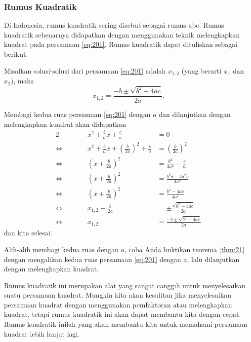 	\subsubsection{Rumus Kuadratik}
		
		Di Indonesia, rumus kuadratik sering disebut sebagai rumus abc. Rumus kuadratik sebenarnya didapatkan dengan menggunakan teknik melengkapkan kuadrat pada persamaan \ref{eq:201}. Rumus kuadratik dapat dituliskan sebagai berikut.
		
		\begin{teorema} \label{thm:21}
			Misalkan solusi-solusi dari persamaan \ref{eq:201} adalah $ x_{1, 2} $ (yang berarti $ x_{1} $ dan $ x_{2} $), maka
			\begin{equation} \label{eq:207}
				x_{1, 2} = \frac{-b \pm \sqrt{b^{2} - 4ac}}{2a}.
			\end{equation}
		\end{teorema}
		\begin{bukti}
			Membagi kedua ruas persamaan \ref{eq:201} dengan $ a $ dan dilanjutkan dengan melengkapkan kuadrat akan didapatkan
			\begin{alignat*}{2}
				&\qquad& x^{2} + \frac{b}{a}x + \frac{c}{a} &= 0 \\
				\iff&& x^{2} + \frac{b}{a}x + \left(\frac{b}{2a}\right)^{2} + \frac{c}{a} &= \left(\frac{b}{2a}\right)^{2} \\
				\iff&& \left(x + \frac{b}{2a}\right)^{2} &= \frac{b^{2}}{4a^{2}} - \frac{c}{a} \\
				\iff&& \left(x + \frac{b}{2a}\right)^{2} &= \frac{b^{2}a - 4a^{2}c}{4a^{3}} \\
				\iff&& \left(x + \frac{b}{2a}\right)^{2} &= \frac{b^{2} - 4ac}{4a^{2}} \\
				\iff&& x_{1, 2} + \frac{b}{2a} &= \pm \frac{\sqrt{b^{2} - 4ac}}{2a} \\
				\iff&& x_{1, 2} &= \frac{-b \pm \sqrt{b^{2} - 4ac}}{2a}
			\end{alignat*}
			dan kita selesai.
		\end{bukti}
	
		\begin{explbox}
			Alih-alih membagi kedua ruas dengan $ a $, coba Anda buktikan teorema \ref{thm:21} dengan mengalikan kedua ruas persamaan \ref{eq:201} dengan $ a $, lalu dilanjutkan dengan melengkapkan kuadrat.
		\end{explbox}
		
		\par Rumus kuadratik ini merupakan alat yang sangat canggih untuk menyelesaikan suatu persamaan kuadrat. Mungkin kita akan kesulitan jika menyelesaikan persamaan kuadrat dengan menggunakan pemfaktoran atau melengkapkan kuadrat, tetapi rumus kuadratik ini akan dapat membantu kita dengan cepat. Rumus kuadratik inilah yang akan membantu kita untuk memahami persamaan kuadrat lebih lanjut lagi.
		
